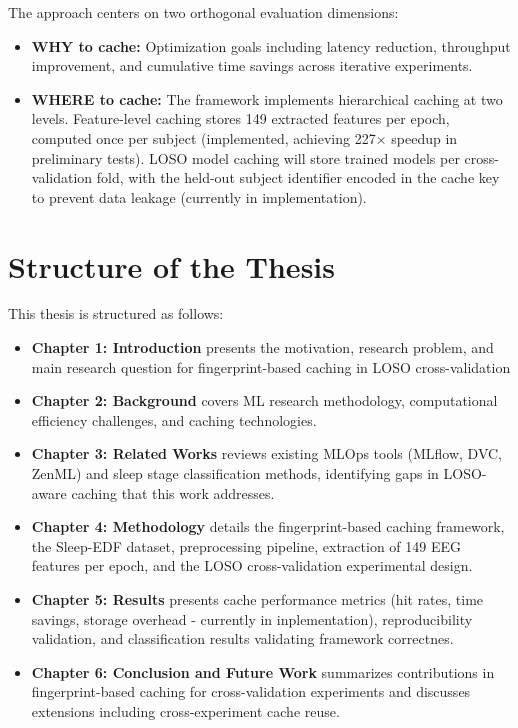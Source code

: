 \documentclass{imc-inf} %
\begin{document}
The approach centers on two orthogonal evaluation dimensions:
\begin{itemize}
\item \textbf{WHY to cache:} Optimization goals including latency reduction, throughput improvement, and cumulative time savings across iterative experiments.
\item \textbf{WHERE to cache:} The framework implements hierarchical caching at two levels. Feature-level caching stores 149 extracted features per epoch, computed once per subject (implemented, achieving 227$\times$ speedup in preliminary tests). LOSO model caching will store trained models per cross-validation fold, with the held-out subject identifier encoded in the cache key to prevent data leakage (currently in implementation).
\end{itemize}

\section{Structure of the Thesis}
This thesis is structured as follows:

\begin{itemize}
\item \textbf{Chapter 1: Introduction} presents the motivation, research problem, and main research question for fingerprint-based caching in LOSO cross-validation

\item \textbf{Chapter 2: Background} covers ML research methodology, computational efficiency challenges, and caching technologies.

\item \textbf{Chapter 3: Related Works} reviews existing MLOps tools (MLflow, DVC, ZenML) and sleep stage classification methods, identifying gaps in LOSO-aware caching that this work addresses.

\item \textbf{Chapter 4: Methodology} details the fingerprint-based caching framework, the Sleep-EDF dataset, preprocessing pipeline, extraction of 149 EEG features per epoch, and the LOSO cross-validation experimental design.

\item \textbf{Chapter 5: Results} presents cache performance metrics (hit rates, time savings, storage overhead - currently in inplementation), reproducibility validation, and classification results validating framework correctnes.

\item \textbf{Chapter 6: Conclusion and Future Work} summarizes contributions in fingerprint-based caching for cross-validation experiments and discusses extensions including cross-experiment cache reuse.
\end{itemize}
\end{document}
